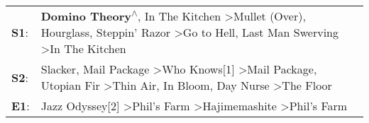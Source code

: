 \begin{supertabular}{p{0.03\textwidth}p{0.92\textwidth}}
 \textbf{S1}:  &          \textbf{Domino Theory\textsuperscript{$\wedge$}}, \enspace In The Kitchen\textsuperscript{} \textgreater \enspace Mullet (Over)\textsuperscript{}, \enspace Hourglass\textsuperscript{}, \enspace Steppin' Razor\textsuperscript{} \textgreater \enspace Go to Hell\textsuperscript{}, \enspace Last Man Swerving\textsuperscript{} \textgreater \enspace In The Kitchen\textsuperscript{}  \enspace  \\
 \textbf{S2}:  &  Slacker\textsuperscript{}, \enspace Mail Package\textsuperscript{} \textgreater \enspace Who Knows[1]\textsuperscript{} \textgreater \enspace Mail Package\textsuperscript{}, \enspace Utopian Fir\textsuperscript{} \textgreater \enspace Thin Air\textsuperscript{}, \enspace In Bloom\textsuperscript{}, \enspace Day Nurse\textsuperscript{} \textgreater \enspace The Floor\textsuperscript{}  \enspace  \\
 \textbf{E1}:  &                                                                                                                                                                                                     Jazz Odyssey[2]\textsuperscript{} \textgreater \enspace Phil's Farm\textsuperscript{} \textgreater \enspace Hajimemashite\textsuperscript{} \textgreater \enspace Phil's Farm\textsuperscript{}  \enspace  \\
\end{supertabular}
